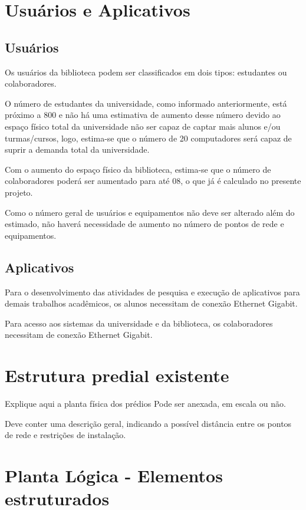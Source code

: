 \documentclass[	DIV=calc,%
							paper=a4,%
							fontsize=12pt,%
							onecolumn]{scrartcl}	 					%
\begin{document}
\section{Usuários e Aplicativos}
 
\subsection{Usuários}
Os usuários da biblioteca podem ser classificados em dois tipos: estudantes ou colaboradores.

O número de estudantes da universidade, como informado anteriormente, está próximo a 800 e não há uma estimativa de aumento desse número devido ao espaço físico total da universidade não ser capaz de captar mais alunos e/ou turmas/cursos, logo, estima-se que o número de 20 computadores será capaz de suprir a demanda total da universidade.

Com o aumento do espaço físico da biblioteca, estima-se que o número de colaboradores poderá ser aumentado para até 08, o que já é calculado no presente projeto.

Como o número geral de usuários e equipamentos não deve ser alterado além do estimado, não haverá necessidade de aumento no número de pontos de rede e equipamentos. 

\subsection{Aplicativos}
Para o desenvolvimento das atividades de pesquisa e execução de aplicativos para demais trabalhos acadêmicos, os alunos necessitam de conexão Ethernet Gigabit.

Para acesso aos sistemas da universidade e da biblioteca, os colaboradores necessitam de conexão Ethernet Gigabit.

\section{Estrutura predial existente}

Explique aqui a planta física dos prédios
Pode ser anexada, em escala ou não.

Deve conter uma descrição geral, indicando a possível distância entre os pontos de rede e restrições de instalação.

\section{Planta Lógica - Elementos estruturados}
\end{document}
